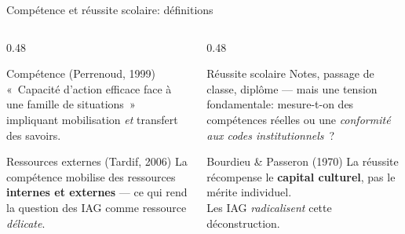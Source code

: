 \begin{frame}{Compétence et réussite scolaire: définitions}
  \begin{columns}[T]
    \begin{column}{0.48\textwidth}
      \begin{block}{Compétence (Perrenoud, 1999)}
        «~Capacité d'action efficace face à une famille
        de situations~» impliquant mobilisation \emph{et}
        transfert des savoirs.
      \end{block}
      \vspace{0.4em}
      \begin{block}{Ressources externes (Tardif, 2006)}
        La compétence mobilise des ressources \textbf{internes
        et externes} --- ce qui rend la question des IAG
        comme ressource \emph{délicate}.
      \end{block}
    \end{column}
    \begin{column}{0.48\textwidth}
      \begin{block}{Réussite scolaire}
        Notes, passage de classe, diplôme ---
        mais une tension fondamentale:
        mesure-t-on des compétences réelles
        ou une \emph{conformité aux codes institutionnels}~?
      \end{block}
      \vspace{0.4em}
      \begin{alertblock}{Bourdieu \& Passeron (1970)}
        La réussite récompense le \textbf{capital culturel},
        pas le mérite individuel.\\
        Les IAG \emph{radicalisent} cette déconstruction.
      \end{alertblock}
    \end{column}
  \end{columns}
\end{frame}

